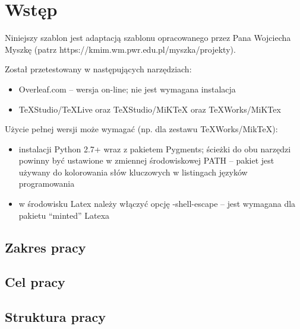 
\chapter*{Wstęp}\label{chapter:introduction}

Niniejszy szablon jest adaptacją szablonu opracowanego przez Pana Wojciecha Myszkę (patrz https://kmim.wm.pwr.edu.pl/myszka/projekty).

Został przetestowany w następujących narzędziach:
\begin{itemize}
    \item Overleaf.com -- wersja on-line; nie jest wymagana instalacja
    \item TeXStudio/TeXLive oraz TeXStudio/MiKTeX oraz TeXWorks/MiKTex
\end{itemize}

Użycie pełnej wersji może wymagać (np. dla zestawu TeXWorks/MikTeX):
\begin{itemize}
    \item instalacji Python 2.7+ wraz z pakietem Pygments; ścieżki do obu narzędzi powinny być ustawione w zmiennej środowiskowej PATH -- pakiet jest używany do kolorowania słów kluczowych w listingach języków programowania
    \item w środowisku Latex należy włączyć opcję -shell-escape  -- jest wymagana dla pakietu ``minted'' Latexa
\end{itemize}

\section*{Zakres pracy}

\lipsum[5]

\section*{Cel pracy}

\lipsum[6]

\section*{Struktura pracy}

\lipsum[7]